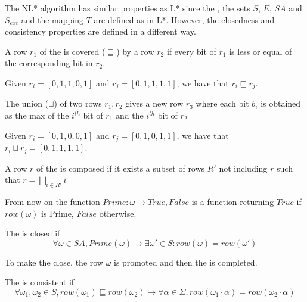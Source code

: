 The NL* algorithm has similar properties as L* since the \OT, the sets $S$, $E$, $SA$ and $S_{ext}$ and the mapping $T$ are defined as in L*. However, the closedness and consistency properties are defined in a different way.

\begin{definition}
  \label{def:row-covering}
  A row $r_1$ of the \OT is covered ($\sqsubseteq$) by a row $r_2$ if every bit of $r_1$ is less or equal of the corresponding bit in $r_2$.
\end{definition}

\begin{example}
  Given $r_i = [0,1,1,0,1]$ and $r_j = [0,1,1,1,1]$, we have that $r_i \sqsubseteq r_j$.
\end{example}

\begin{definition}
  \label{def:row-union}
  The union ($\sqcup$) of two rows $r_1, r_2$ gives a new row $r_3$ where each bit $b_i$ is obtained as the max of the $i^{th}$ bit of $r_1$ and the $i^{th}$ bit of $r_2$
\end{definition}

\begin{example}
  Given $r_i = [0,1,0,0,1]$ and $r_j = [0,1,0,1,1]$, we have that $r_i \sqcup r_j = [0,1,1,1,1]$.
\end{example}

\begin{definition}
  A row $r$ of the \OT is composed if it exists a subset of rows $R'$ not including $r$ such that $r = \bigsqcup\limits_{i \in R'}i$
\end{definition}

\begin{notation}
  From now on the function $Prime: \omega \rightarrow {True, False}$ is a function returning $True$ if $row(\omega)$ is Prime, $False$ otherwise.
\end{notation}

\begin{definition}[Closedness]
  The \OT is closed if
  \[\forall \omega \in SA, Prime(\omega) \rightarrow \exists \omega' \in S: row(\omega) = row(\omega')\]
\end{definition}

To make the \OT close, the row $\omega$ is promoted and then the \OT is completed.

\begin{definition}[Consistency]
  The \OT is consistent if
  \[
    \forall \omega_1, \omega_2 \in S,
    row(\omega_1) \sqsubseteq row( \omega_2) \rightarrow
    \forall \alpha \in \Sigma,
    row(\omega_1 \cdot \alpha) = row(\omega_2 \cdot \alpha)
  \]
\end{definition}

